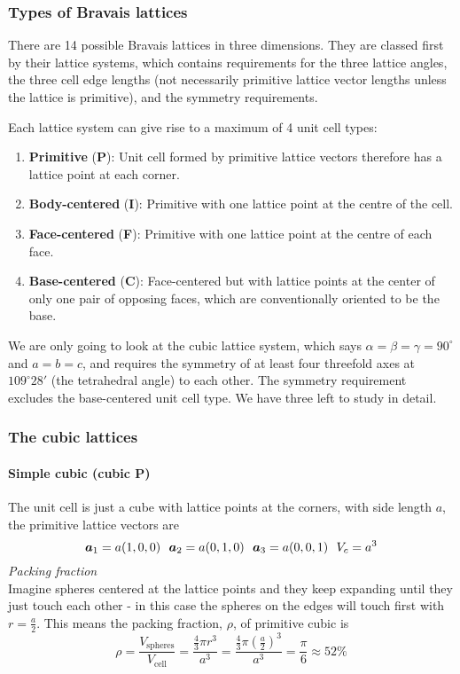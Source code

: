 \subsubsection{Types of Bravais lattices}
\label{bravaistypes}
There are 14 possible Bravais lattices in three dimensions. They are classed first by their lattice systems, which contains requirements for the three lattice angles, the three cell edge lengths (not necessarily primitive lattice vector lengths unless the lattice is primitive), and the symmetry requirements.\par
Each lattice system can give rise to a maximum of 4 unit cell types:
\begin{enumerate}
	\item \textbf{Primitive} (\textbf{P}): Unit cell formed by primitive lattice vectors therefore has a lattice point at each corner.
	\item \textbf{Body-centered} (\textbf{I}): Primitive with one lattice point at the centre of the cell.
	\item \textbf{Face-centered} (\textbf{F}): Primitive with one lattice point at the centre of each face.
	\item \textbf{Base-centered} (\textbf{C}): Face-centered but with lattice points at the center of only one pair of opposing faces, which are conventionally oriented to be the base.
\end{enumerate}
We are only going to look at the cubic lattice system, which says $\alpha=\beta=\gamma=90^{\circ}$ and $a=b=c$, and requires the symmetry of at least four threefold axes at $109^{\circ}28'$ (the tetrahedral angle) to each other. The symmetry requirement excludes the base-centered unit cell type. We have three left to study in detail.
\subsubsection{The cubic lattices}
\paragraph{Simple cubic (cubic P)} 
The unit cell is just a cube with lattice points at the corners, with side length $a$, the primitive lattice vectors are 
\begin{equation*}
	\bvec{a}_1=a(1,0,0)\ \ \bvec{a}_2=a(0,1,0)\ \ \bvec{a}_3=a(0,0,1)\ \ V_c=a^3
\end{equation*}
\emph{Packing fraction}\\
Imagine spheres centered at the lattice points and they keep expanding until they just touch each other - in this case the spheres on the edges will touch first with $r=\frac{a}{2}$. This means the packing fraction, $\rho$, of primitive cubic is
\begin{equation}
	\rho=\frac{V_{\mathrm{spheres}}}{V_{\mathrm{cell}}}=\frac{\tfrac{4}{3}\pi r^3}{a^3}=\frac{\tfrac{4}{3}\pi(\tfrac{a}{2})^3}{a^3}=\frac{\pi}{6}\approx52\%
\end{equation}
